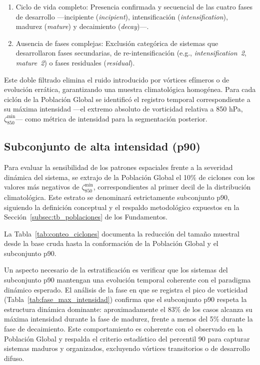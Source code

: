 \begin{enumerate}
    \item Ciclo de vida completo: Presencia confirmada y secuencial de las cuatro fases de desarrollo —incipiente (\textit{incipient}), intensificación (\textit{intensification}), madurez (\textit{mature}) y decaimiento (\textit{decay})—.
    \item Ausencia de fases complejas: Exclusión categórica de sistemas que desarrollaron fases secundarias, de re-intensificación (e.g., \textit{intensification~2}, \textit{mature~2}) o fases residuales (\textit{residual}).
\end{enumerate}

Este doble filtrado elimina el ruido introducido por vórtices efímeros o de evolución errática, garantizando una muestra climatológica homogénea. Para cada ciclón de la Población Global se identificó el registro temporal correspondiente a su máxima intensidad —el extremo absoluto de vorticidad relativa a 850 hPa, $\zeta_{850}^{\min}$— como métrica de intensidad para la segmentación posterior.

\subsection{Subconjunto de alta intensidad (p90)}\label{subsec:subconjuntos_intensidad}

Para evaluar la sensibilidad de los patrones espaciales frente a la severidad dinámica del sistema, se extrajo de la Población Global el 10\% de ciclones con los valores más negativos de $\zeta_{850}^{\min}$, correspondientes al primer decil de la distribución climatológica. Este estrato se denominará estrictamente subconjunto p90, siguiendo la definición conceptual y el respaldo metodológico expuestos en la Sección~\ref{subsec:tb_poblaciones} de los Fundamentos.

La Tabla~\ref{tab:conteo_ciclones} documenta la reducción del tamaño muestral desde la base cruda hasta la conformación de la Población Global y el subconjunto p90.



Un aspecto necesario de la estratificación es verificar que los sistemas del subconjunto p90 mantengan una evolución temporal coherente con el paradigma dinámico esperado. El análisis de la fase en que se registra el pico de vorticidad (Tabla~\ref{tab:fase_max_intensidad}) confirma que el subconjunto p90 respeta la estructura dinámica dominante: aproximadamente el 83\% de los casos alcanza su máxima intensidad durante la fase de madurez, frente a menos del 5\% durante la fase de decaimiento. Este comportamiento es coherente con el observado en la Población Global y respalda el criterio estadístico del percentil 90 para capturar sistemas maduros y organizados, excluyendo vórtices transitorios o de desarrollo difuso.

